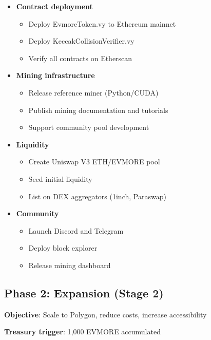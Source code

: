 \documentclass[11pt,a4paper]{article}
\begin{document}
\begin{itemize}
    \item \textbf{Contract deployment}
    \begin{itemize}
        \item Deploy EvmoreToken.vy to Ethereum mainnet
        \item Deploy KeccakCollisionVerifier.vy
        \item Verify all contracts on Etherscan
    \end{itemize}
    \item \textbf{Mining infrastructure}
    \begin{itemize}
        \item Release reference miner (Python/CUDA)
        \item Publish mining documentation and tutorials
        \item Support community pool development
    \end{itemize}
    \item \textbf{Liquidity}
    \begin{itemize}
        \item Create Uniswap V3 ETH/EVMORE pool
        \item Seed initial liquidity
        \item List on DEX aggregators (1inch, Paraswap)
    \end{itemize}
    \item \textbf{Community}
    \begin{itemize}
        \item Launch Discord and Telegram
        \item Deploy block explorer
        \item Release mining dashboard
    \end{itemize}
\end{itemize}

\subsection{Phase 2: Expansion (Stage 2)}

\textbf{Objective}: Scale to Polygon, reduce costs, increase accessibility

\textbf{Treasury trigger}: 1,000 EVMORE accumulated
\end{document}
